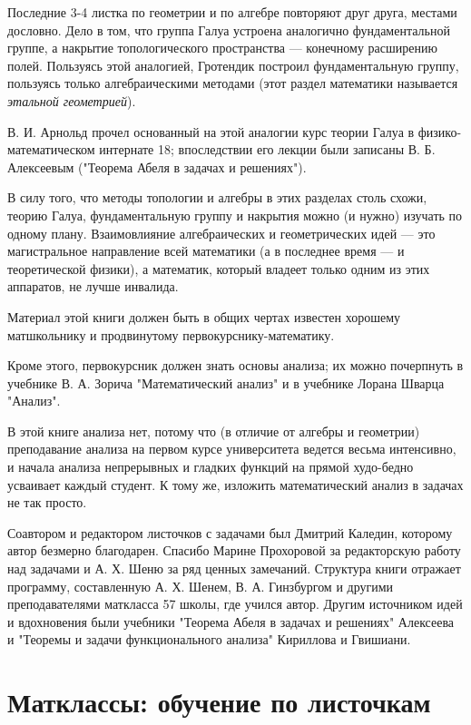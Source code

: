 \documentclass[12pt]{book}
\theoremstyle{upshape}
\theoremstyle{generic}
\def\еза{\end{remark}}
\theoremstyle{upshapenonumber}
\newcommand{\следствие}{%
     \refstepcounter{teorema}
     {\noindent\bf Следствие \thechapter.\arabic{teorema}:\ }}
\newcommand{\пример}{%
     \refstepcounter{teorema}
     {\noindent\bf Пример \thechapter.\arabic{teorema}:\ }}
\newcommand{\лемма}{%
     \refstepcounter{teorema}
     {\noindent\bf Лемма \thechapter.\arabic{teorema}:\ }}
\newcommand{\теорема}{%
     \refstepcounter{teorema}
     {\noindent\bf Теорема \thechapter.\arabic{teorema}:\ }}
\newcommand{\утверждение}{%
     \refstepcounter{teorema}
     {\noindent\bf Утверждение \thechapter.\arabic{teorema}:\ }}
\def\ем{\em}
\def\ез{\end{zadacha}}
\def\еу{\end{ukazanie}}
\def\ео{\end{opredelenie}}
\def\енум{\begin{enumerate}}
\def\ее{\end{enumerate}}
\begin{document}
Последние 3-4 листка по геометрии и по алгебре
повторяют друг друга, местами дословно. Дело в том,
что группа Галуа устроена аналогично фундаментальной
группе, а накрытие топологического пространства --- 
конечному расширению полей. Пользуясь этой аналогией,
Гротендик построил фундаментальную группу,
пользуясь только алгебраическими методами
(этот раздел математики называется {\ем этальной
геометрией}). 

В. И. Арнольд прочел основанный на этой аналогии
курс теории Галуа в физико-математическом интернате 18;
впоследствии его лекции были записаны В. Б. Алексеевым
("Теорема Абеля в задачах и решениях"). 

В силу того, что методы топологии и алгебры
в этих разделах столь схожи, теорию Галуа, фундаментальную группу
и накрытия можно (и нужно) изучать по одному плану. 
Взаимовлияние алгебраических и геометрических идей ---
это магистральное направление всей математики (а в последнее
время --- и теоретической физики), а математик,
который владеет только одним из этих аппаратов,
не лучше инвалида. 

Материал этой книги должен быть в общих чертах 
известен хорошему матшкольнику и продвинутому 
первокурснику-математику. 

Кроме этого, первокурсник должен знать основы анализа;
их можно почерпнуть в учебнике В. А. Зорича
"Математический анализ" и в учебнике Лорана
Шварца "Анализ".

В этой книге анализа нет, потому что 
(в отличие от алгебры и геометрии) преподавание
анализа на первом курсе университета  ведется
весьма интенсивно, и начала анализа непрерывных
и гладких функций на прямой худо-бедно 
усваивает каждый студент. К тому же, изложить
математический анализ в задачах не так просто.

Соавтором и редактором листочков с задачами
был Дмитрий Каледин, которому автор безмерно благодарен.
Спасибо Марине Прохоровой за редакторскую работу над
задачами и А. Х. Шеню за ряд ценных замечаний. 
Структура книги отражает программу, составленную
А. Х. Шенем,  В. А. Гинзбургом и другими 
преподавателями маткласса 57 школы, где учился 
автор. Другим источником идей и вдохновения были
учебники "Теорема Абеля в задачах 
и решениях" Алексеева и "Теоремы и задачи 
функционального анализа" Кириллова и Гвишиани.





\section{Матклассы: обучение по листочкам}
\end{document}
